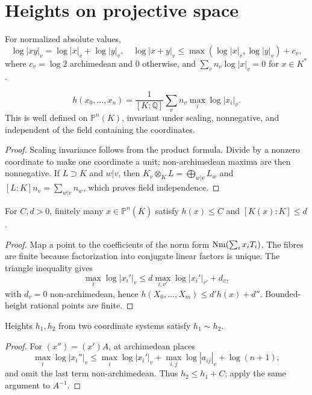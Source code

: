 \section{Heights on projective space}\label{mumford-appendix-II-heights-source}
For normalized absolute values,
\[
\log|xy|_v=\log|x|_v+\log|y|_v,\quad
\log|x+y|_v\le\max(\log|x|_v,\log|y|_v)+c_v,
\]
where $c_v=\log2$ archimedean and $0$ otherwise, and
$\sum_vn_v\log|x|_v=0$ for $x\in K^*$.
\begin{lemma}\label{mumford-lem-projective-height}
\[
h(x_0,\ldots,x_n)=\frac1{[K:\mathbb Q]}\sum_vn_v\max_i\log|x_i|_v.\tag{6}
\]
This is well defined on $\mathbb P^n(K)$, invariant under scaling, nonnegative,
and independent of the field containing the coordinates.
\end{lemma}
\begin{proof}
Scaling invariance follows from the product formula. Divide by a nonzero
coordinate to make one coordinate a unit; non-archimedean maxima are then
nonnegative. If $L\supset K$ and $w|v$, then
$K_v\otimes_KL=\bigoplus_{w|v}L_w$ and
$[L:K]n_v=\sum_{w|v}n_w$, which proves field independence.

\end{proof}
\begin{proposition}\label{mumford-prop-bounded-height-projective}
\label{mumford-lem-northcott-abelian}
For $C,d>0$, finitely many $x\in\mathbb P^n(\overline K)$ satisfy
$h(x)\le C$ and $[K(x):K]\le d$.
\end{proposition}
\begin{proof}
Map a point to the coefficients of the norm form
${\rm Nm}(\sum_i x_iT_i)$. The fibres are finite because factorization into
conjugate linear factors is unique. The triangle inequality gives
\[
\max_i\log|x_i'|_v\le d\max_{i,v'}\log|x_i'|_{v'}+d_v,
\]
with $d_v=0$ non-archimedean, hence $h(X_0,\ldots,X_m)\le d'h(x)+d''$.
Bounded-height rational points are finite.

\end{proof}
\begin{proposition}\label{mumford-prop-equivalent-projective-heights}
Heights $h_1,h_2$ from two coordinate systems satisfy $h_1\sim h_2$.
\end{proposition}
\begin{proof}
For $(x'')=(x')A$, at archimedean places
\[
\max_i\log|x_i''|_v\le\max_i\log|x_i'|_v+\max_{i,j}\log|a_{ij}|_v+\log(n+1),
\]
and omit the last term non-archimedean. Thus $h_2\le h_1+C$; apply the same
argument to $A^{-1}$.

\end{proof}
